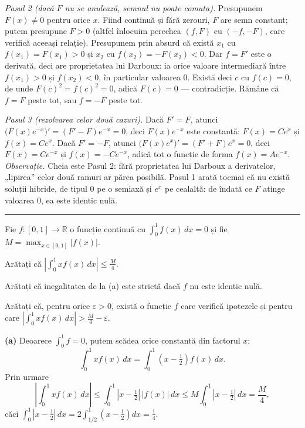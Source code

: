 \noindent\textit{Pasul 2 (dacă $F$ nu se anulează, semnul nu poate comuta).}
Presupunem $F(x)\neq0$ pentru orice $x$. Fiind continuă și fără zerouri, $F$ are
semn constant; putem presupune $F>0$ (altfel înlocuim perechea $(f,F)$ cu
$(-f,-F)$, care verifică aceeași relație). Presupunem prin absurd că există
$x_1$ cu $f(x_1)=F(x_1)>0$ și $x_2$ cu $f(x_2)=-F(x_2)<0$. Dar $f=F'$ este o
derivată, deci are proprietatea lui Darboux: ia orice valoare intermediară între
$f(x_1)>0$ și $f(x_2)<0$, în particular valoarea $0$. Există deci $c$ cu
$f(c)=0$, de unde $F(c)^2=f(c)^2=0$, adică $F(c)=0$ --- contradicție. Rămâne că
$f=F$ peste tot, sau $f=-F$ peste tot.

\noindent\textit{Pasul 3 (rezolvarea celor două cazuri).} Dacă $F'=F$, atunci
$\bigl(F(x)e^{-x}\bigr)'=(F'-F)e^{-x}=0$, deci $F(x)e^{-x}$ este constantă:
$F(x)=Ce^{x}$ și $f(x)=Ce^{x}$. Dacă $F'=-F$, atunci
$\bigl(F(x)e^{x}\bigr)'=(F'+F)e^{x}=0$, deci $F(x)=Ce^{-x}$ și
$f(x)=-Ce^{-x}$, adică tot o funcție de forma $f(x)=Ae^{-x}$.\\[2pt]
\emph{Observație.} Cheia este Pasul 2: fără proprietatea lui Darboux a derivatelor,
„lipirea'' celor două ramuri ar părea posibilă. Pasul 1 arată tocmai că nu există
soluții hibride, de tipul $0$ pe o semiaxă și $e^{x}$ pe cealaltă: de îndată ce
$F$ atinge valoarea $0$, ea este identic nulă.
\vspace{1mm}\hrule

Fie $f:[0,1]\to\mathbb{R}$ o funcție continuă cu $\displaystyle\int_0^1 f(x)\,dx = 0$
și fie $M=\max_{x\in[0,1]}|f(x)|$.
\begin{parti}
  \item Arătați că $\displaystyle\left|\int_0^1 x f(x)\,dx\right| \le \frac{M}{4}$.
  \item Arătați că inegalitatea de la (a) este strictă dacă $f$ nu este identic nulă.
  \item Arătați că, pentru orice $\varepsilon>0$, există o funcție $f$ care verifică
        ipotezele și pentru care
        $\displaystyle\left|\int_0^1 x f(x)\,dx\right| > \frac{M}{4}-\varepsilon$.
\end{parti}
\sol\noindent\textbf{(a)} Deoarece $\int_0^1 f = 0$, putem scădea orice constantă
din factorul $x$:
\[ \int_0^1 x f(x)\,dx = \int_0^1\left(x-\tfrac12\right)f(x)\,dx . \]
Prin urmare
\[ \left|\int_0^1 x f(x)\,dx\right|
\le \int_0^1\left|x-\tfrac12\right|\,|f(x)|\,dx
\le M\int_0^1\left|x-\tfrac12\right|\,dx = \frac{M}{4} , \]
căci $\int_0^1|x-\frac12|\,dx = 2\int_{1/2}^1\left(x-\frac12\right)dx = \frac14$.

